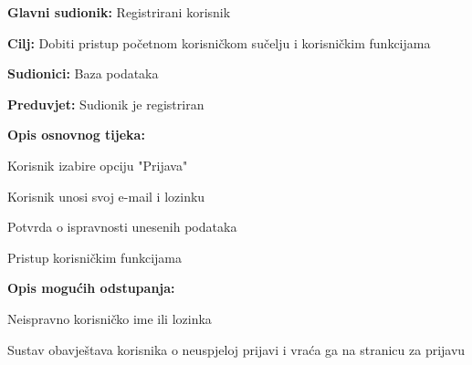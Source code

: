 			\noindent {}
			\begin{packed_item}
				
				\item \textbf{Glavni sudionik: }Registrirani korisnik
				\item  \textbf{Cilj:} Dobiti pristup početnom korisničkom sučelju i korisničkim funkcijama
				\item  \textbf{Sudionici:} Baza podataka
				\item  \textbf{Preduvjet:} Sudionik je registriran
				\item  \textbf{Opis osnovnog tijeka:}
				
				\item[] \begin{packed_enum}
					
					\item Korisnik izabire opciju "Prijava"
					\item Korisnik unosi svoj e-mail i lozinku
					\item Potvrda o ispravnosti unesenih podataka
					\item Pristup korisničkim funkcijama
					
				\end{packed_enum}
				
				\item  \textbf{Opis mogućih odstupanja:}
				
				\item[] \begin{packed_item}
					
					\item[3.a] Neispravno korisničko ime ili lozinka
					
					\item[] \begin{packed_enum}
						
						\item Sustav obavještava korisnika o neuspjeloj prijavi i vraća ga na stranicu za prijavu
						
					\end{packed_enum}
				\end{packed_item}
			\end{packed_item}
		
